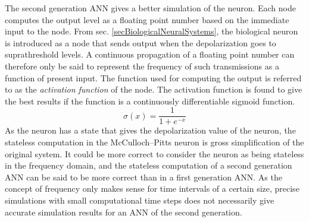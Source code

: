 	The second generation ANN gives a better simulation of the neuron. %
	Each node computes the output level as a floating point number based on the immediate input to the node.
	From sec. \ref{secBiologicalNeuralSystems}, the biological neuron is introduced as a node that sends output when the depolarization goes to suprathreshold levels.
	A continuous propagation of a floating point number can therefore only be said to represent the frequency of such transmissions as a function of present input.
	The function used for computing the output is referred to as the \emph{activation function} of the node.
	The activation function is found to give the best results if the function is a continuously differentiable sigmoid function\cite{HaykinANNbok}.
	\begin{equation}
		\sigma(x)=\frac{1}{1+e^{-x}}   %
	\end{equation}
	As the neuron has a state that gives the depolarization value of the neuron, the stateless computation in the McCulloch--Pitts neuron is gross simplification of the original system.
	It could be more correct to consider the neuron as being stateless in the frequency domain, and the stateless computation of a second generation ANN can be said to be more correct than in a first generation ANN.
	As the concept of frequency only makes sense for time intervals of a certain size, precise simulations with small computational time steps does not necessarily give accurate simulation results for an ANN of the second generation. 
